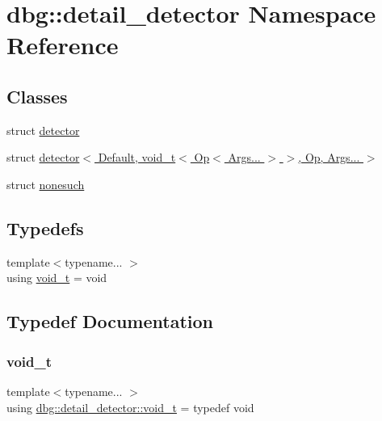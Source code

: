 \hypertarget{namespacedbg_1_1detail__detector}{}\section{dbg\+:\+:detail\+\_\+detector Namespace Reference}
\label{namespacedbg_1_1detail__detector}
\subsection*{Classes}
\begin{DoxyCompactItemize}
\item 
struct \hyperlink{structdbg_1_1detail__detector_1_1detector}{detector}
\item 
struct \hyperlink{structdbg_1_1detail__detector_1_1detector_3_01Default_00_01void__t_3_01Op_3_01Args_8_8_8_01_4_01_4_00_01Op_00_01Args_8_8_8_01_4}{detector$<$ Default, void\+\_\+t$<$ Op$<$ Args... $>$ $>$, Op, Args... $>$}
\item 
struct \hyperlink{structdbg_1_1detail__detector_1_1nonesuch}{nonesuch}
\end{DoxyCompactItemize}
\subsection*{Typedefs}
\begin{DoxyCompactItemize}
\item 
{\footnotesize template$<$typename... $>$ }\\using \hyperlink{namespacedbg_1_1detail__detector_a1dbadccf461338e71c55ea392d4ed47c}{void\+\_\+t} = void
\end{DoxyCompactItemize}


\subsection{Typedef Documentation}
\mbox{\label{namespacedbg_1_1detail__detector_a1dbadccf461338e71c55ea392d4ed47c}} 
\subsubsection{\texorpdfstring{void\+\_\+t}{void\_t}}
{\footnotesize\ttfamily template$<$typename... $>$ \\
using \hyperlink{namespacedbg_1_1detail__detector_a1dbadccf461338e71c55ea392d4ed47c}{dbg\+::detail\+\_\+detector\+::void\+\_\+t} = typedef void}

